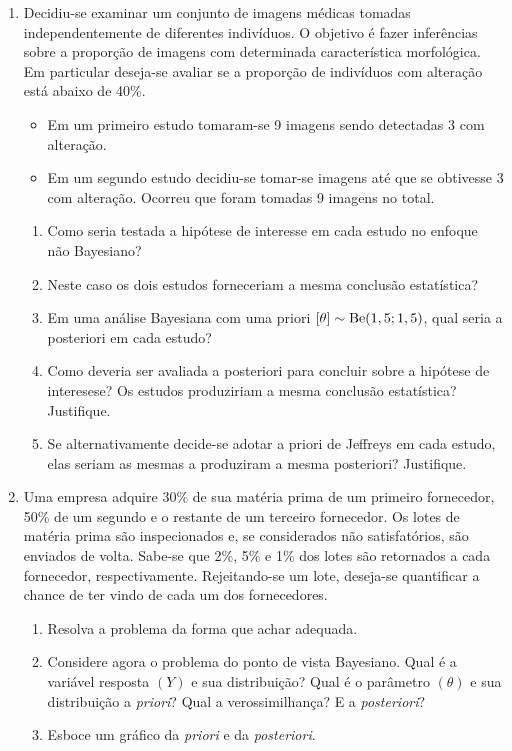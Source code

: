 \documentclass[11pt,a4]{article}\usepackage[]{graphicx}\usepackage[]{xcolor}
\begin{document}
\begin{enumerate}
\item Decidiu-se examinar um conjunto de imagens médicas tomadas independentemente
  de diferentes indivíduos. O objetivo é fazer inferências sobre a proporção de imagens 
  com determinada característica morfológica.
  Em particular deseja-se avaliar se a proporção de indivíduos com alteração está
  abaixo de 40\%.
\begin{itemize}
  \item Em um primeiro estudo tomaram-se 9 imagens sendo detectadas 3 com alteração.
  \item Em um segundo estudo decidiu-se tomar-se imagens até que se obtivesse 3 com
    alteração. Ocorreu que foram tomadas 9 imagens no total.
\end{itemize}
\begin{enumerate}
\item  Como seria testada a hipótese de interesse em cada estudo no enfoque não Bayesiano?
\item Neste caso os dois estudos forneceriam a mesma conclusão estatística?
\item Em uma análise Bayesiana com uma priori $[\theta] \sim {\rm Be}(1,5 ; 1,5)$,
  qual seria a posteriori em cada estudo? 
\item Como deveria ser avaliada a posteriori para concluir sobre a hipótese de interesese?
  Os estudos produziriam a mesma conclusão estatística? Justifique.
\item Se alternativamente decide-se adotar a priori de Jeffreys em cada estudo, 
  elas seriam as mesmas a produziram a mesma posteriori? Justifique. 
\end{enumerate}


\item Uma empresa adquire 30\% de sua matéria prima de um primeiro fornecedor, 50\% de um segundo e o restante de um terceiro fornecedor.
Os lotes de matéria prima são inspecionados e, se considerados não satisfatórios, são enviados de volta.
Sabe-se que 2\%, 5\% e 1\% dos lotes são retornados a cada fornecedor, respectivamente.
Rejeitando-se um lote, deseja-se quantificar a chance de ter vindo de cada um dos fornecedores.
\begin{enumerate}
\item Resolva a problema da forma que achar adequada.
\item Considere agora o problema do ponto de vista Bayesiano.
  Qual é a variável resposta $(Y)$ e sua distribuição?
  Qual é o parâmetro $(\theta)$ e sua distribuição a {\it priori}?
 Qual a verossimilhança? E a {\it posteriori}?
\item Esboce um gráfico da {\it priori} e da {\it posteriori}.
\end{enumerate}






\end{enumerate}
\end{document}
